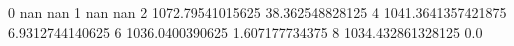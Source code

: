 0 nan nan
1 nan nan
2 1072.79541015625 38.362548828125
4 1041.3641357421875 6.9312744140625
6 1036.0400390625 1.607177734375
8 1034.432861328125 0.0
